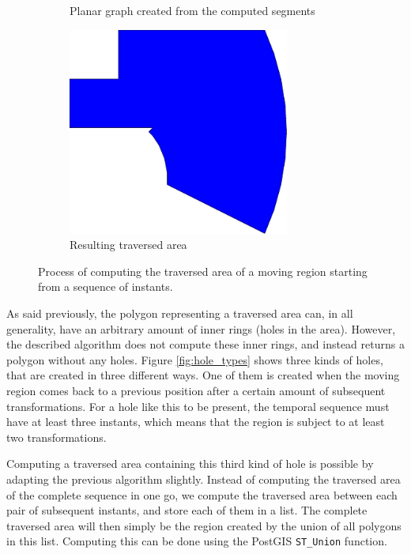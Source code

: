 \begin{figure}[h!]
\begin{subfigure}{.3\textwidth}
        \caption{Planar graph created from the computed segments}
        \label{fig:planar_graph}
    \end{subfigure}
    \hfill
    \begin{subfigure}{.3\textwidth}
        \centering
        \includegraphics[width=0.8\textwidth]{images/process_traversed_area.pdf}
        \caption{Resulting traversed area}{}
    \end{subfigure}
    \caption[Process of computing the traversed area of a moving region]{Process of computing the traversed area of a moving region starting from a sequence of instants.}
    \label{fig:traversed_area_process}
\end{figure}

As said previously, the polygon representing a traversed area can, in all generality, have an arbitrary amount of inner rings (holes in the area). However, the described algorithm does not compute these inner rings, and instead returns a polygon without any holes. Figure \ref{fig:hole_types} shows three kinds of holes, that are created in three different ways. One of them is created when the moving region comes back to a previous position after a certain amount of subsequent transformations. For a hole like this to be present, the temporal sequence must have at least three instants, which means that the region is subject to at least two transformations.

Computing a traversed area containing this third kind of hole is possible by adapting the previous algorithm slightly. Instead of computing the traversed area of the complete sequence in one go, we compute the traversed area between each pair of subsequent instants, and store each of them in a list. The complete traversed area will then simply be the region created by the union of all polygons in this list. Computing this can be done using the PostGIS \lstinline{ST_Union} function.